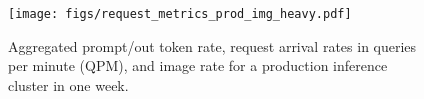 \begin{figure}[!t]
  \centering
  \texttt{[image: figs/request\_metrics\_prod\_img\_heavy.pdf]}
  \caption{Aggregated prompt/out token rate, request arrival rates in queries per minute (QPM), and image rate for a production \lmm{} inference cluster in one week.
  }
  \label{fig:qpm-prod}
\end{figure}